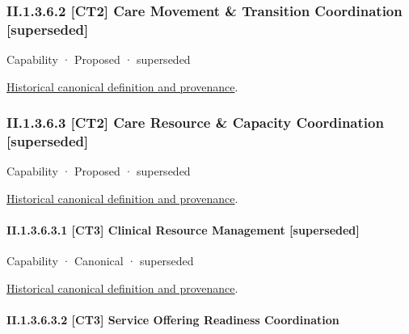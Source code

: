 \subsubsection*{II.1.3.6.2 [CT2] Care Movement \& Transition Coordination [superseded]}
\label{navigation:II.1.3.6.2}

\label{element:59b9331fa3c04ef09bf963ad8a5d0d71}
{\small Capability · Proposed · superseded}\par
\href{../../../../../../../continuum/strategy/capability/59b9331fa3c04ef09bf963ad8a5d0d71.md}{Historical canonical definition and provenance}.\par
\subsubsection*{II.1.3.6.3 [CT2] Care Resource \& Capacity Coordination [superseded]}
\label{navigation:II.1.3.6.3}

\label{element:96f71cb8fa6844d7aa7e9f16759a3a62}
{\small Capability · Proposed · superseded}\par
\href{../../../../../../../continuum/strategy/capability/96f71cb8fa6844d7aa7e9f16759a3a62.md}{Historical canonical definition and provenance}.\par
\paragraph*{II.1.3.6.3.1 [CT3] Clinical Resource Management [superseded]}
\label{navigation:II.1.3.6.3.1}

\label{element:a5faedcd97064c28b9e7e551e9106ea1}
{\small Capability · Canonical · superseded}\par
\href{../../../../../../../continuum/strategy/capability/a5faedcd97064c28b9e7e551e9106ea1.md}{Historical canonical definition and provenance}.\par
\paragraph*{II.1.3.6.3.2 [CT3] Service Offering Readiness Coordination}
\label{navigation:II.1.3.6.3.2}

